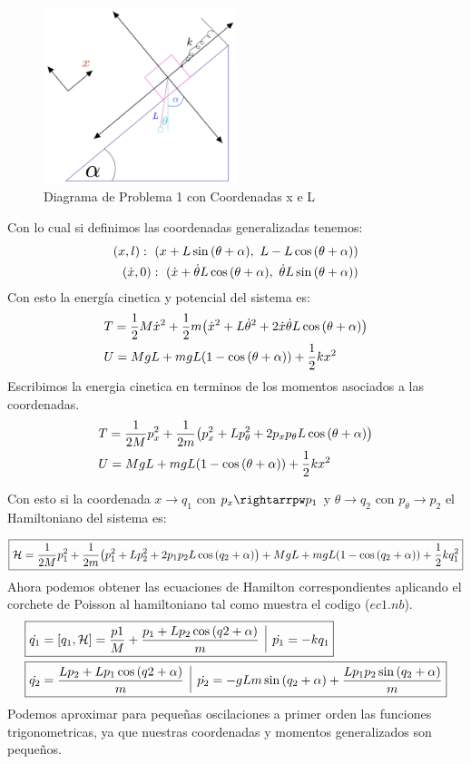 \documentclass[12pt]{article}
\renewcommand{\H}{\mathcal{H}}
\newcommand{\en}[1]{\[\boxed{#1}\]}
\newcommand{\coss}[1]{\cos{\qty(#1)}}
\newcommand{\sinn}[1]{\sin{\qty(#1)}}
\newcommand{\vl}{\,\,\, \vline \,\,\,}
\begin{document}
\begin{figure}[h!]
    \centering
    \includegraphics[width=0.5\textwidth]{dg_1.png}
    \caption{Diagrama de Problema 1 con Coordenadas x e L}
    \label{dg_1}
\end{figure}
Con lo cual si definimos las coordenadas generalizadas tenemos:
\begin{align}
(x,l):\,\,(x+L\sinn{\theta+\alpha},\,\,L-L\coss{\theta+\alpha})\\
(\dot{x},0):\,\, (\dot{x}+\dot{\theta}L\coss{\theta+\alpha},\,\, \dot{\theta}L\sinn{\theta+\alpha})	
\end{align}
Con esto la energía cinetica y potencial del sistema es:
\begin{align}
&T=\frac{1}{2}M \dot{x}^2 	+\frac{1}{2}m \qty(\dot{x}^2+L \dot{\theta}^2 +2\dot{x} \dot{\theta}L\coss{\theta+\alpha})\\
&U= MgL+mgL(1-\coss{\theta+\alpha})+\frac{1}{2}kx^2
\end{align}
Escribimos la energia cinetica en terminos de los momentos asociados a las coordenadas.
\begin{align}
	&T=\frac{1}{2M} p_x^2 	+\frac{1}{2m}\qty(p_{x}^2+L p_{\theta}^2 +2p_{x} p_{\theta}L\coss{\theta+\alpha})\\
	&U= MgL+mgL(1-\coss{\theta+\alpha})+\frac{1}{2}kx^2
\end{align}

Con esto si la coordenada $x \rightarrow q_1$ con $p_x  \rightarrpw p_1$ y $\theta \rightarrow q_2$ con $p_\theta \rightarrow p_2$ el Hamiltoniano del sistema es:

\en{\H= \frac{1}{2M} p_1^2 	+\frac{1}{2m}\qty(p_{1}^2+L p_{2}^2 +2p_{1} p_{2}L\coss{q_2+\alpha})+ MgL+mgL(1-\coss{q_2+\alpha})+\frac{1}{2}kq_1^2}
Ahora podemos obtener las ecuaciones de Hamilton correspondientes aplicando el corchete de Poisson al hamiltoniano tal como muestra el codigo ($ec1.nb$).
\begin{align}
&\boxed{\dot{q_1}=[q_1,\H]=	\frac{p1}{M}+ \frac{p_1+L p_2 \coss{q2+\alpha}}{m}\vl \dot{p_1}=-kq_1}\\
&\boxed{\dot{q_2}= \frac{Lp_2+ L p_1 \coss{q2+\alpha}}{m}\vl \dot{p_2}= -gLm\sinn{q_2+\alpha}+\frac{Lp_1 p_2 \sinn{q_2+\alpha}}{m}}
\end{align}
Podemos aproximar para pequeñas oscilaciones a primer orden las funciones trigonometricas, ya que nuestras coordenadas y momentos generalizados son pequeños.
\end{document}
